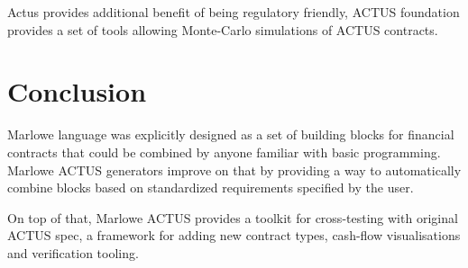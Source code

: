 \documentclass[runningheads]{llncs}
\begin{document}
Actus provides additional benefit of being regulatory friendly, ACTUS
foundation provides a set of tools allowing Monte-Carlo simulations
of ACTUS contracts.

\section{Conclusion}
\label{conclusion}

Marlowe language was explicitly designed as a set of building blocks
for financial contracts that could be combined by anyone familiar
with basic programming. Marlowe ACTUS generators improve on that by
providing a way to automatically combine blocks based on standardized
requirements specified by the user.

On top of that, Marlowe ACTUS provides a toolkit for cross-testing
with original ACTUS spec, a framework for adding new contract types,
cash-flow visualisations and verification tooling.

%
%
%


%
\end{document}

